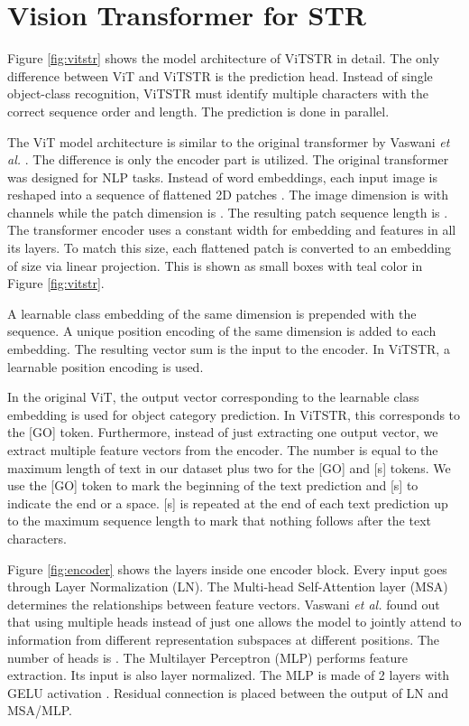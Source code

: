 \documentclass[runningheads]{llncs}
\begin{document}
\section{Vision Transformer for STR}

Figure \ref{fig:vitstr} shows the model architecture of ViTSTR in detail. The only difference between ViT and ViTSTR is the prediction head. Instead of single object-class recognition, ViTSTR must identify multiple characters with the correct sequence order and length. The prediction is done in parallel.

The ViT model architecture is similar to the original transformer by Vaswani \textit{et al.} \cite{vaswani2017attention}. The difference is only the encoder part is utilized. The original transformer was designed for NLP tasks. Instead of word embeddings, each input image  is reshaped into a sequence of flattened 2D patches . The image dimension is  with  channels while the patch dimension is . The resulting patch sequence length is . The transformer encoder uses a constant width  for embedding and features in all its layers. To match this size, each flattened patch is converted to an embedding of size  via linear projection. This is shown as small boxes with teal color in Figure \ref{fig:vitstr}. 

A learnable class embedding of the same dimension  is prepended with the sequence. A unique position encoding of the same dimension  is added to each embedding. The resulting vector sum is the input to the encoder. In ViTSTR, a learnable position encoding is used.

In the original ViT, the output vector corresponding to the learnable class embedding is used for object category prediction. In ViTSTR, this corresponds to the [GO] token. Furthermore, instead of just extracting one output vector, we extract multiple feature vectors from the encoder. The number is equal to the maximum length of text in our dataset plus two for the [GO] and [s] tokens. We use the [GO] token to mark the beginning of the text prediction and [s] to indicate the end or a space. [s] is repeated at the end of each text prediction up to the maximum sequence length to mark that nothing follows after the text characters.

Figure \ref{fig:encoder} shows the layers inside one encoder block. Every input goes through Layer Normalization (LN). The Multi-head Self-Attention layer (MSA) determines the relationships between feature vectors. Vaswani \textit{et al.} \cite{vaswani2017attention} found out that using multiple heads instead of just one allows the model to jointly attend to information from different representation subspaces at different positions. The number of heads is . The Multilayer Perceptron (MLP) performs feature extraction. Its input is also layer normalized. The MLP is made of 2 layers with GELU activation \cite{hendrycks2016gaussian}. Residual connection is placed between the output of LN and MSA/MLP.
\end{document}
